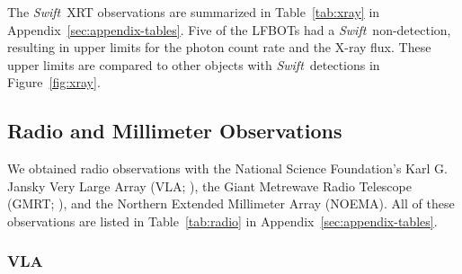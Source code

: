 \documentclass[twocolumn,twocolappendix, linenumbers, trackchanges]{aastex7}
\newcommand{\swift}{\emph{Swift}}
\begin{document}
The \swift\ XRT observations are summarized in Table~\ref{tab:xray} in Appendix~\ref{sec:appendix-tables}.  Five of the  LFBOTs had a \swift\ non-detection, resulting in upper limits for the photon count rate and the X-ray flux.  These upper limits are compared to other objects with \swift\ detections in Figure~\ref{fig:xray}. 

\subsection{Radio and Millimeter Observations}

 We obtained radio observations with the National Science Foundation's Karl G. Jansky Very Large Array (VLA; \citealt{vla, evla}), the Giant Metrewave Radio Telescope (GMRT; \citealt{gmrt}), and the Northern Extended Millimeter Array (NOEMA).  All of these observations are listed in Table~\ref{tab:radio} in Appendix~\ref{sec:appendix-tables}.
 
\subsubsection{VLA}
\end{document}
